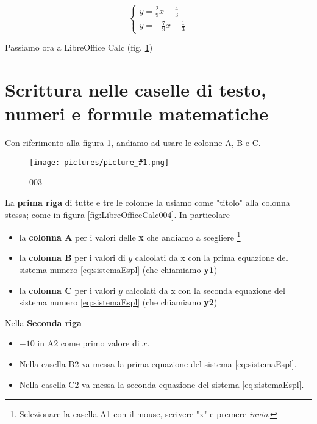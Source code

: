 \documentclass[17pt]{extarticle}
\newcommand{\pict}[1]{
\begin{figure}[h!]		
	\centering
   	\texttt{[image: pictures/picture\_\#1.png]}
  	\caption{#1}
   	\label{fig:LibreOfficeCalc#1}
\end{figure}
}
\begin{document}
\begin{equation}\label{eq:sistemaEspl}
  	\begin{cases}
		y = \frac{2}{9}x - \frac{4}{3}\\
		y = -\frac{7}{9}x - \frac{1}{3}
	\end{cases}
\end{equation}


Passiamo ora a LibreOffice Calc (fig. \ref{fig:LibreOfficeCalc003})
%



\newpage



\section{Scrittura nelle caselle di testo, numeri e formule matematiche}

Con riferimento alla figura \ref{fig:LibreOfficeCalc003}, andiamo ad usare le colonne A, B e C. 

\pict{003}

La {\bf prima riga } di tutte e tre le colonne la usiamo come "titolo" alla colonna stessa; come in figura \ref{fig:LibreOfficeCalc004}. In particolare

\begin{itemize}
	\item la {\bf colonna A} per i valori delle {\bf x} che andiamo a scegliere \footnote{Selezionare la casella A1 con il mouse, scrivere "x" e premere \emph{invio}. }
	\item la {\bf colonna B} per i valori di $y$ calcolati da x con la prima equazione del sistema numero \ref{eq:sistemaEspl} (che chiamiamo {\bf y1})
	\item la {\bf colonna C} per i valori $y$ calcolati da x con la seconda equazione del sistema numero \ref{eq:sistemaEspl} (che chiamiamo {\bf y2})
\end{itemize}

\vspace{1cm}

Nella {\bf Seconda riga} 

\begin{itemize}
	\item $-10$ in A2  come primo valore di $x$.
	\item Nella casella B2 va messa la prima equazione del sistema \ref{eq:sistemaEspl}.
	\item Nella casella C2 va messa la seconda equazione del sistema \ref{eq:sistemaEspl}.
\end{itemize}
\end{document}
